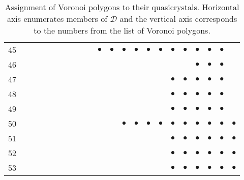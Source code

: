 \documentclass[text.tex]{subfiles}
\begin{document}
\begin{table}
\begin{tabular}{l|ccccccccccccccccccccc}
45  &           &           &           &           &           &           &           &           &           & $\bullet$ & $\bullet$ & $\bullet$ & $\bullet$ & $\bullet$ & $\bullet$ & $\bullet$ & $\bullet$ & $\bullet$ & $\bullet$ & $\bullet$ &           \\
46  &           &           &           &           &           &           &           &           &           &           &           &           &           &           &           &           &           & $\bullet$ & $\bullet$ & $\bullet$ &           \\ 
47  &           &           &           &           &           &           &           &           &           &           &           &           &           &           &           & $\bullet$ & $\bullet$ & $\bullet$ & $\bullet$ & $\bullet$ &           \\
48  &           &           &           &           &           &           &           &           &           &           &           &           &           &           &           & $\bullet$ & $\bullet$ & $\bullet$ & $\bullet$ & $\bullet$ &           \\ 
49  &           &           &           &           &           &           &           &           &           &           &           &           &           &           &           & $\bullet$ & $\bullet$ & $\bullet$ & $\bullet$ & $\bullet$ &           \\
50  &           &           &           &           &           &           &           &           &           &           &           & $\bullet$ & $\bullet$ & $\bullet$ & $\bullet$ & $\bullet$ & $\bullet$ & $\bullet$ & $\bullet$ & $\bullet$ & $\bullet$ \\ 
51  &           &           &           &           &           &           &           &           &           &           &           &           &           &           &           & $\bullet$ & $\bullet$ & $\bullet$ & $\bullet$ & $\bullet$ & $\bullet$ \\
52  &           &           &           &           &           &           &           &           &           &           &           &           &           &           &           & $\bullet$ & $\bullet$ & $\bullet$ & $\bullet$ & $\bullet$ & $\bullet$ \\
53  &           &           &           &           &           &           &           &           &           &           &           &           &           &           &           & $\bullet$ & $\bullet$ & $\bullet$ & $\bullet$ & $\bullet$ & $\bullet$ \\
\bottomrule
\end{tabular}
\caption{Assignment of Voronoi polygons to their quasicrystals. Horizontal axis enumerates members of $\mathcal{D}$ and the vertical axis corresponds to the numbers from the list of Voronoi polygons.}
\label{table:tiles1}
\end{table}

\restoregeometry
\end{document}
